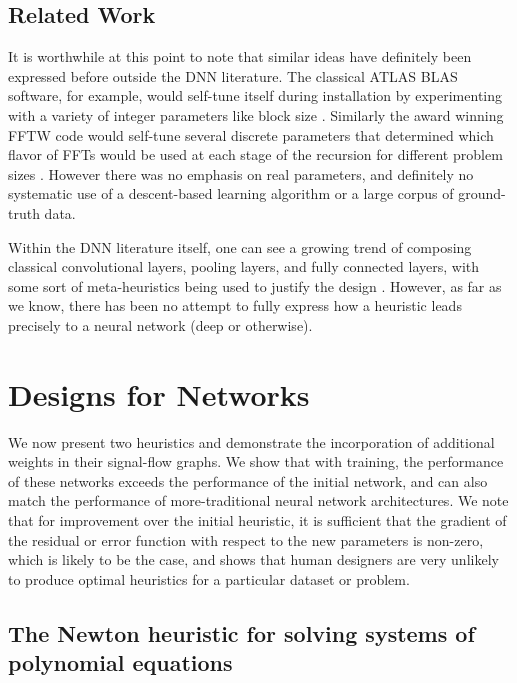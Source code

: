 \documentclass{article}
\begin{document}
\subsection{Related Work}
It is worthwhile at this point to note that similar ideas have definitely been expressed before outside the DNN literature. The classical ATLAS BLAS software, for example, would self-tune itself during installation by experimenting with a variety of integer parameters like block size \cite{demmel2005self}. Similarly the award winning FFTW code would self-tune several discrete parameters that determined which flavor of FFTs would be used at each stage of the recursion for different problem sizes \cite{frigo1998fftw}. However there was no emphasis on real parameters, and definitely no systematic use of a descent-based learning algorithm or a large corpus of ground-truth data.

Within the DNN literature itself, one can see a growing trend of composing classical convolutional layers, pooling layers, and fully connected layers, with some sort of meta-heuristics being used to justify the design \cite{grauman2011learning,han2015matchnet,pinheiro2016learning}. However, as far as we know, there has been no attempt to fully express how a heuristic leads precisely to a neural network (deep or otherwise).

\section{Designs for Networks} %
We now present two heuristics and demonstrate the incorporation of additional weights in their signal-flow graphs. We show that with training, the performance of these networks exceeds the performance of the initial network, and can also match the performance of more-traditional neural network architectures. We note that for improvement over the initial heuristic, it is sufficient that the gradient of the residual or error function with respect to the new parameters is non-zero, which is likely to be the case, and shows that human designers are very unlikely to produce optimal heuristics for a particular dataset or problem.

\subsection*{The Newton heuristic for solving systems of polynomial equations}
\end{document}
